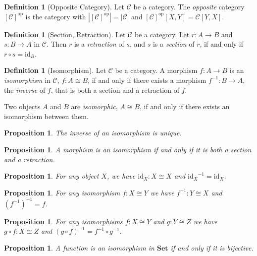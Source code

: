 \documentclass{book}
\newtheorem{proposition}[lemma]{Proposition}
\theoremstyle{definition}
\newtheorem{definition}[lemma]{Definition}
\newcommand{\CC}{\ensuremath{\mathcal{C}}}
\newcommand{\id}[1]{\ensuremath{\mathrm{id}_{#1}}}
\newcommand{\inv}[1]{\ensuremath{{#1}^{-1}}}
\newcommand{\op}[1]{\ensuremath{[#1]^{\mathrm{op}}}}
\begin{document}
\begin{definition}[Opposite Category]
    Let $\CC$ be a category. The \emph{opposite} category $\op{\CC}$ is the category with
    $|\op{\CC}| = |\CC|$ and $\op{\CC}[X,Y] = \CC[Y,X]$.
\end{definition}

\begin{definition}[Section, Retraction]
    Let $\CC$ be a category.
    Let $r : A \rightarrow B$ and $s : B \rightarrow A$ in $\CC$. Then $r$ is a \emph{retraction} of $s$,
    and $s$ is a \emph{section} of $r$, if and only if $r \circ s = \id{B}$.
\end{definition}

\begin{definition}[Isomorphism]
    Let $\CC$ be a category. A morphism $f : A \rightarrow B$ is an \emph{isomorphism} in $\CC$, $f : A \cong B$,
    if and only if there exists a morphism $\inv{f} : B \rightarrow A$, the \emph{inverse} of $f$, that is both
    a section and a retraction of $f$.

    Two objects $A$ and $B$ are \emph{isomorphic}, $A \cong B$, if and only if there exists an isomorphism between them.
\end{definition}

\begin{proposition}
    The inverse of an isomorphism is unique.
\end{proposition}

\begin{proposition}
    A morphism is an isomorphism if and only if it is both a section and a retraction.
\end{proposition}

\begin{proposition}
    For any object $X$, we have $\id{X} : X \cong X$ and $\inv{\id{X}} = \id{X}$.
\end{proposition}

\begin{proposition}
    For any isomorphism $f : X \cong Y$ we have $\inv{f} : Y \cong X$ and $\inv{(\inv{f})} = f$.
\end{proposition}

\begin{proposition}
    For any isomorphisms $f : X \cong Y$ and $g : Y \cong Z$ we have $g \circ f : X \cong Z$
    and $\inv{(g \circ f)} = \inv{f} \circ \inv{g}$.
\end{proposition}

\begin{proposition}
    A function is an isomorphism in $\mathbf{Set}$ if and only if it is bijective.
\end{proposition}
\end{document}
